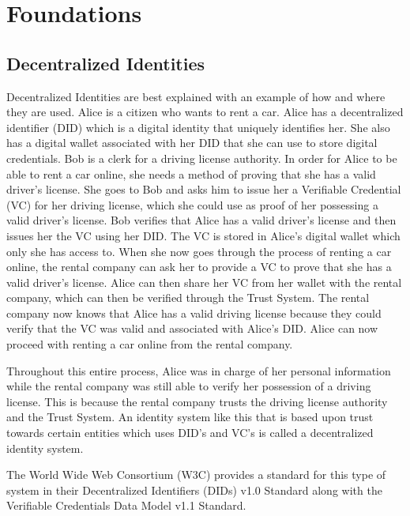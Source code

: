 \chapter{Foundations}
\label{cha:foundations}


\section{Decentralized Identities}

Decentralized Identities are best explained with an example of how and where they are used.
Alice is a citizen who wants to rent a car. Alice has a decentralized identifier (DID) which is a digital identity
that uniquely identifies her. She also has a digital wallet associated with her DID that she can use
to store digital credentials. Bob is a clerk for a driving license authority.
In order for Alice to be able to rent a car online, she needs a method of proving that she has a valid
driver's license. She goes to Bob and asks him to issue her a Verifiable Credential (VC) for her driving
license, which she could use as proof of her possessing a valid driver's license.
Bob verifies that Alice has a valid driver's license and then issues her the VC using her DID.
The VC is stored in Alice's digital wallet which only she has access to.
When she now goes through the process of renting a car online, the rental company
can ask her to provide a VC to prove that she has a valid driver's license.
Alice can then share her VC from her wallet with the rental company, which can then be
verified through the Trust System. The rental company now knows that Alice has a valid driving license
because they could verify that the VC was valid and associated with Alice's DID.
Alice can now proceed with renting a car online from the rental company.

Throughout this entire process, Alice was in charge of her personal information while
the rental company was still able to verify her possession of a driving license. This is because
the rental company trusts the driving license authority and the Trust System.
An identity system like this that is based upon trust towards certain entities which uses DID's and VC's is called
a decentralized identity system.

The World Wide Web Consortium (W3C) provides a standard for this type of system in their Decentralized Identifiers (DIDs) v1.0
Standard along with the Verifiable Credentials Data Model v1.1 Standard.

